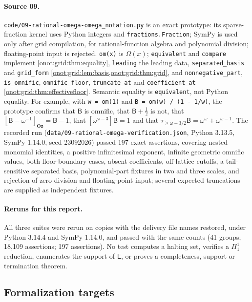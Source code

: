 \documentclass[11pt,oneside]{article}
\numberwithin{equation}{section}
\theoremstyle{definition}
\theoremstyle{remark}
\newcommand{\Oz}{\mathbf{Oz}}
\newcommand{\sB}{\mathsf B}
\newcommand{\Om}{\Omega}
\newcommand{\fl}[1]{\left\lfloor #1\right\rfloor_{\Oz}}
\newcommand{\fn}[1]{\nolinkurl{#1}}
\begin{document}
\paragraph{Source 09.} \fn{code/09-rational-omega-omega\_notation.py} is an exact
prototype: its sparse-fraction kernel uses Python integers and
\texttt{fractions.Fraction}; SymPy is used only after grid compilation, for
rational-function algebra and polynomial division; floating-point input is
rejected. \texttt{om(x)} is $\Om(x)$; \texttt{equivalent} and \texttt{compare}
implement \cref{onot:grid:thm:equality}, \texttt{leading} the leading data,
\texttt{separated\_basis} and \texttt{grid\_form}
\cref{onot:grid:lem:basis,onot:grid:thm:grid}, and \texttt{nonnegative\_part},
\texttt{is\_omnific}, \texttt{omnific\_floor}, \texttt{truncate\_at} and
\texttt{coefficient\_at} \cref{onot:grid:thm:effectivefloor}. Semantic equality is
\texttt{equivalent}, not Python equality. For example, with
\texttt{w = om(1)} and \texttt{B = om(w) / (1 - 1/w)}, the prototype confirms that
$\sB$ is omnific, that $\sB+\tfrac12$ is not, that $\fl{\sB-\omega^{-1}}=\sB-1$,
that $[\omega^{\omega-3}]\sB=1$ and that
$\tau_{\ge\omega-3/2}\sB=\omega^\omega+\omega^{\omega-1}$. The recorded run
(\fn{data/09-rational-omega-verification.json}, Python 3.13.5, SymPy 1.14.0, seed
23092026) passed 197 exact assertions, covering nested monomial identities, a
positive infinitesimal exponent, infinite geometric omnific values, both
floor-boundary cases, absent coefficients, off-lattice cutoffs, a tail-sensitive
separated basis, polynomial-part fixtures in two and three scales, and rejection of
zero division and floating-point input; several expected truncations are supplied
as independent fixtures.

\paragraph{Reruns for this report.} All three suites were rerun on copies with the
delivery file names restored, under Python 3.14.4 and SymPy 1.14.0, and passed
with the same counts (41 groups; 18{,}109 assertions; 197 assertions). No test
computes a halting set, verifies a $\Pi^1_1$ reduction, enumerates the support of
$\mathsf E$, or proves a completeness, support or termination theorem.

\subsection{Formalization targets}
\end{document}
